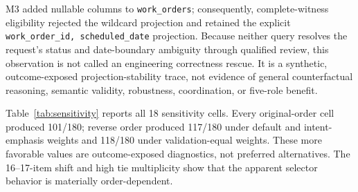 \documentclass[applsci,article,submit,moreauthors]{Definitions/mdpi}
\begin{document}
\begin{table}[htbp]
\caption{Q039 is the sole validation-only versus complete-witness selection difference. Correctness is agreement with the frozen synthetic reference, not an independently adjudicated engineering judgment.}
\label{tab:q039}
\centering
\footnotesize
{}
\end{table}

M3 added nullable columns to \texttt{work\_orders}; consequently, complete-witness eligibility rejected the wildcard projection and retained the explicit \texttt{work\_order\_id, scheduled\_date} projection. Because neither query resolves the request's status and date-boundary ambiguity through qualified review, this observation is not called an engineering correctness rescue. It is a synthetic, outcome-exposed projection-stability trace, not evidence of general counterfactual reasoning, semantic validity, robustness, coordination, or five-role benefit.

Table~\ref{tab:sensitivity} reports all 18 sensitivity cells. Every original-order cell produced 101/180; reverse order produced 117/180 under default and intent-emphasis weights and 118/180 under validation-equal weights. These more favorable values are outcome-exposed diagnostics, not preferred alternatives. The 16--17-item shift and high tie multiplicity show that the apparent selector behavior is materially order-dependent.
\end{document}
